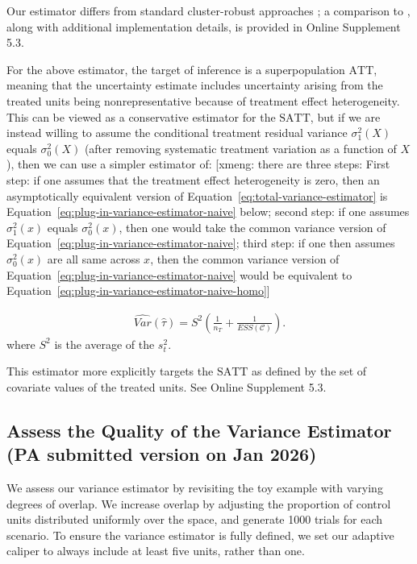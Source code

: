 \documentclass[11pt]{article}
\newcommand{\xmeng}[1]{
  {\color{blue} [xmeng: {#1}]}
 }
\newcommand{\ATT}{\mathrm{ATT}}
\newcommand{\SATT}{\mathrm{SATT}}
\begin{document}
Our estimator differs from standard cluster-robust approaches \citep{abadie2022robust}; a comparison to \citet{abadie2006large}, along with additional implementation details, is provided in Online Supplement 5.3.

For the above estimator, the target of inference is a superpopulation $\ATT$, meaning that the uncertainty estimate includes uncertainty arising from the treated units being nonrepresentative because of treatment effect heterogeneity.
This can be viewed as a conservative estimator for the $\SATT$, but if we are instead willing to assume the conditional treatment residual variance $\sigma^2_1(X)$ equals $\sigma^2_0(X)$ (after removing systematic treatment variation as a function of $X$), then we can use a simpler estimator of: \xmeng{there are three steps: First step: if one assumes that the treatment effect heterogeneity is zero, then an asymptotically equivalent version of Equation~\ref{eq:total-variance-estimator} is Equation~\ref{eq:plug-in-variance-estimator-naive} below; second step: if one assumes $\sigma^2_1(x)$ equals $\sigma^2_0(x)$, then one would take the common variance version of Equation~\ref{eq:plug-in-variance-estimator-naive}; third step: if one then assumes $\sigma^2_0(x)$ are all same across $x$, then the common variance version of Equation~\ref{eq:plug-in-variance-estimator-naive} would be equivalent to Equation~\ref{eq:plug-in-variance-estimator-naive-homo}}

 \begin{align}
 \label{eq:plug-in-variance-estimator-naive-homo}
     \widehat{Var}(\hat{\tau})
     = S^2 \left( \frac{1}{n_T} + \frac{1}{ESS(\mathcal{C})} \right).
 \end{align}
where $S^2$ is the average of the $s_t^2$.


This estimator more explicitly targets the $\SATT$ as defined by the set of covariate values of the treated units.
See Online Supplement 5.3.


\subsection{Assess the Quality of the Variance Estimator (PA submitted version on Jan 2026)}
\label{sec:Inference-Results}

We assess our variance estimator by revisiting the toy example with varying degrees of overlap. We increase overlap by adjusting the proportion of control units distributed uniformly over the space, and generate 1000 trials for each scenario.
To ensure the variance estimator is fully defined, we set our adaptive caliper to always include at least five units, rather than one.
\end{document}
